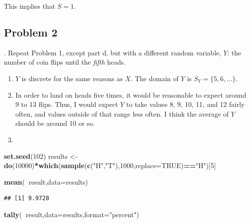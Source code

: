 \documentclass[
]{book}
\newenvironment{Shaded}{\begin{snugshade}}{\end{snugshade}}
\newcommand{\DataTypeTok}[1]{\textcolor[rgb]{0.13,0.29,0.53}{#1}}
\newcommand{\DecValTok}[1]{\textcolor[rgb]{0.00,0.00,0.81}{#1}}
\newcommand{\KeywordTok}[1]{\textcolor[rgb]{0.13,0.29,0.53}{\textbf{#1}}}
\newcommand{\NormalTok}[1]{#1}
\newcommand{\OperatorTok}[1]{\textcolor[rgb]{0.81,0.36,0.00}{\textbf{#1}}}
\newcommand{\OtherTok}[1]{\textcolor[rgb]{0.56,0.35,0.01}{#1}}
\newcommand{\StringTok}[1]{\textcolor[rgb]{0.31,0.60,0.02}{#1}}
\begin{document}
This implies that \(S = 1\).

\hypertarget{problem-2-9}{%
\subsection{Problem 2}\label{problem-2-9}}

. Repeat Problem 1, except part d, but with a different random variable, \(Y\): the number of coin flips until the \emph{fifth} heads.

\begin{enumerate}
\def\labelenumi{\alph{enumi}.}
\item
  \(Y\) is discrete for the same reasons as \(X\). The domain of \(Y\) is \(S_Y=\{5,6,...\}\).
\item
  In order to land on heads five times, it would be reasonable to expect around 9 to 13 flips. Thus, I would expect \(Y\) to take values 8, 9, 10, 11, and 12 fairly often, and values outside of that range less often. I think the average of \(Y\) should be around 10 or so.
\item
\end{enumerate}

\begin{Shaded}
\begin{Highlighting}[]
\KeywordTok{set.seed}\NormalTok{(}\DecValTok{102}\NormalTok{)}
\NormalTok{results <-}\StringTok{ }\KeywordTok{do}\NormalTok{(}\DecValTok{10000}\NormalTok{)}\OperatorTok{*}\KeywordTok{which}\NormalTok{(}\KeywordTok{sample}\NormalTok{(}\KeywordTok{c}\NormalTok{(}\StringTok{"H"}\NormalTok{,}\StringTok{"T"}\NormalTok{),}\DecValTok{1000}\NormalTok{,}\DataTypeTok{replace=}\OtherTok{TRUE}\NormalTok{)}\OperatorTok{==}\StringTok{"H"}\NormalTok{)[}\DecValTok{5}\NormalTok{]}
\end{Highlighting}
\end{Shaded}

\begin{Shaded}
\begin{Highlighting}[]
\KeywordTok{mean}\NormalTok{(}\OperatorTok{~}\NormalTok{result,}\DataTypeTok{data=}\NormalTok{results)}
\end{Highlighting}
\end{Shaded}

\begin{verbatim}
## [1] 9.9728
\end{verbatim}

\begin{Shaded}
\begin{Highlighting}[]
\KeywordTok{tally}\NormalTok{(}\OperatorTok{~}\NormalTok{result,}\DataTypeTok{data=}\NormalTok{results,}\DataTypeTok{format=}\StringTok{"percent"}\NormalTok{)}
\end{Highlighting}
\end{Shaded}
\end{document}
